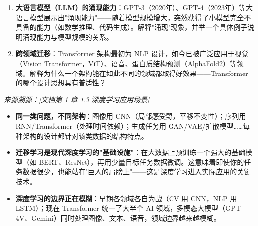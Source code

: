 \documentclass[a4paper,11pt]{ctexart}
\begin{document}
\begin{problembox}
\begin{enumerate}[(1)]
        \item \textbf{大语言模型（LLM）的涌现能力}：GPT-3（2020年）、GPT-4（2023年）等大语言模型展示出"涌现能力"——随着模型规模增大，突然获得了小模型完全不具备的能力（如数学推理、代码生成）。解释"涌现"现象，并举一个具体例子说明涌现能力与模型规模的关系。

        \item \textbf{跨领域迁移}：Transformer 架构最初为 NLP 设计，如今已被广泛应用于视觉（Vision Transformer，ViT）、语音、蛋白质结构预测（AlphaFold2）等领域。解释为什么一个架构能在如此不同的领域都取得好效果——Transformer 的哪个设计思想具有普适性？
    \end{enumerate}

    \vspace{0.2cm}
    {\color{gray}\small\textit{来源溯源：[文档第 1 章 1.3 深度学习应用场景]}}
\end{problembox}

\begin{beginnerbox}
    \begin{itemize}
        \item \textbf{同一类问题，不同架构}：图像用 CNN（局部感受野，平移不变性）；序列用 RNN/Transformer（处理时间依赖）；生成任务用 GAN/VAE/扩散模型……每种架构的设计都针对该类数据的结构特点。
        \item \textbf{迁移学习是现代深度学习的"基础设施"}：在大数据上预训练一个强大的基础模型（如 BERT、ResNet），再用少量目标任务数据微调。这意味着即使你的任务数据很少，也能站在"巨人的肩膀上"——这是深度学习进入实际应用的关键技术。
        \item \textbf{深度学习的边界正在模糊}：早期各领域各自为战（CV 用 CNN，NLP 用 LSTM）；现在 Transformer 统一了大半个 AI 领域，多模态大模型（GPT-4V、Gemini）同时处理图像、文本、语音，领域边界越来越模糊。
    \end{itemize}
\end{beginnerbox}
\end{document}
